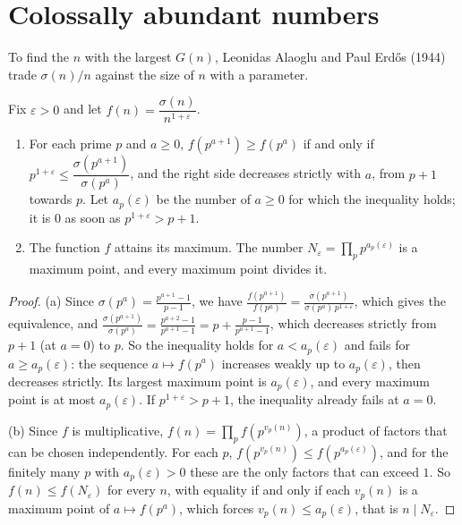 \section{Colossally abundant numbers}

To find the $n$ with the largest $G(n)$, Leonidas Alaoglu and Paul Erd\H{o}s (1944) trade $\sigma(n)/n$ against the size of $n$ with a parameter.

\begin{proposition}\label{conjectures:prop:ca}
Fix $\varepsilon>0$ and let $f(n)=\dfrac{\sigma(n)}{n^{1+\varepsilon}}$.
\begin{enumerate}[label=(\alph*)]
\item For each prime $p$ and $a\ge0$, $f(p^{a+1})\ge f(p^a)$ if and only if $p^{1+\varepsilon}\le\dfrac{\sigma(p^{a+1})}{\sigma(p^a)}$, and the right side decreases strictly with
$a$, from $p+1$ towards $p$. Let $a_p(\varepsilon)$ be the number of $a\ge0$ for which the inequality holds; it is $0$ as soon as $p^{1+\varepsilon}>p+1$.
\item The function $f$ attains its maximum. The number $N_\varepsilon=\prod_pp^{a_p(\varepsilon)}$ is a maximum point, and every maximum point divides it.
\end{enumerate}
\end{proposition}
\begin{proof}
(a) Since $\sigma(p^a)=\frac{p^{a+1}-1}{p-1}$, we have $\frac{f(p^{a+1})}{f(p^a)}=\frac{\sigma(p^{a+1})}{\sigma(p^a)\,p^{1+\varepsilon}}$, which gives the equivalence, and
$\frac{\sigma(p^{a+1})}{\sigma(p^a)}=\frac{p^{a+2}-1}{p^{a+1}-1}=p+\frac{p-1}{p^{a+1}-1}$, which decreases strictly from $p+1$ (at $a=0$) to $p$. So the inequality
holds for $a<a_p(\varepsilon)$ and fails for $a\ge a_p(\varepsilon)$: the sequence $a\mapsto f(p^a)$ increases weakly up to $a_p(\varepsilon)$, then decreases strictly. Its
largest maximum point is $a_p(\varepsilon)$, and every maximum point is at most $a_p(\varepsilon)$. If $p^{1+\varepsilon}>p+1$, the inequality already fails at $a=0$.

(b) Since $f$ is multiplicative, $f(n)=\prod_pf(p^{v_p(n)})$, a product of factors that can be chosen independently. For each $p$, $f(p^{v_p(n)})\le f(p^{a_p(\varepsilon)})$,
and for the finitely many $p$ with $a_p(\varepsilon)>0$ these are the only factors that can exceed $1$. So $f(n)\le f(N_\varepsilon)$ for every $n$, with equality if
and only if each $v_p(n)$ is a maximum point of $a\mapsto f(p^a)$, which forces $v_p(n)\le a_p(\varepsilon)$, that is $n\mid N_\varepsilon$.
\end{proof}

